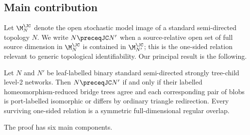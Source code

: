 \subsection{Main contribution}

Let $\M_N^{\JC}$ denote the open stochastic model image of a standard semi-directed topology $N$.  We write $N\preceqJC N'$ when a source-relative open set of full source dimension in $\M_N^{\JC}$ is contained in $\M_{N'}^{\JC}$; this is the one-sided relation relevant to generic topological identifiability.  Our principal result is the following.

\begin{theorem*}
Let $N$ and $N'$ be leaf-labelled binary standard semi-directed strongly tree-child level-2 networks.  Then $N\preceqJC N'$ if and only if their labelled homeomorphism-reduced bridge trees agree and each corresponding pair of blobs is port-labelled isomorphic or differs by ordinary triangle redirection.  Every surviving one-sided relation is a symmetric full-dimensional regular overlap.
\end{theorem*}

The proof has six main components.


